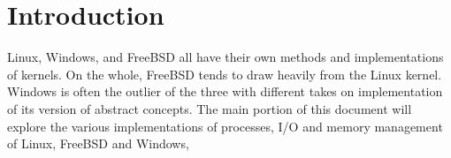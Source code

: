 \section{Introduction}
Linux, Windows, and FreeBSD all have their own methods and implementations of kernels. On the whole, FreeBSD tends to draw heavily from the Linux kernel. Windows is often the outlier of the three with different takes on implementation of its version of abstract concepts. The main portion of this document will explore the various implementations of processes, I/O and memory management of Linux, FreeBSD and Windows,
